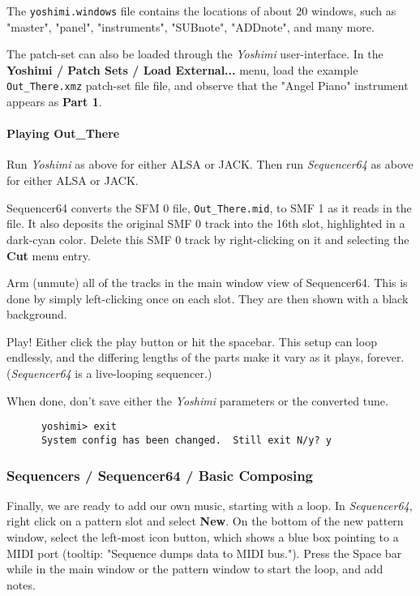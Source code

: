   The \texttt{yoshimi.windows} file contains the locations of about 20
   windows, such as "master", "panel", "instruments", "SUBnote", "ADDnote",
   and many more.

   The patch-set can also be loaded through the \textsl{Yoshimi}
   user-interface.
   In the \textbf{Yoshimi / Patch Sets / Load External...} menu, load the
   example \texttt{Out\_There.xmz} patch-set file file, and observe that
   the "Angel Piano" instrument appears as \textbf{Part 1}.

\paragraph{Playing Out\_There}
\label{paragraph:yoshimi_playing_out_there}

   Run \textsl{Yoshimi} as above for either ALSA or JACK.
   Then run \textsl{Sequencer64} as above for either ALSA or JACK.

   Sequencer64 converts the SFM 0 file, \texttt{Out\_There.mid},
   to SMF 1 as it reads in the file.
   It also deposits the original SMF 0 track into the 16th slot, highlighted in
   a dark-cyan color.
   Delete this SMF 0 track by right-clicking on it and selecting the
   \textbf{Cut} menu entry.

   Arm (unmute) all of the tracks in the main window view of Sequencer64.
   This is done by simply left-clicking once on each slot.
   They are then shown with a black background.

   Play!  Either click the play button or hit the spacebar.
   This setup can loop endlessly, and the differing lengths of the parts
   make it vary as it plays, forever.  (\textsl{Sequencer64} is a live-looping
   sequencer.)

   When done, don't save either the \textsl{Yoshimi} parameters or the
   converted tune.

   \begin{verbatim}
      yoshimi> exit
      System config has been changed.  Still exit N/y? y
   \end{verbatim}

\subsubsection{Sequencers / Sequencer64 / Basic Composing}
\label{subsubsec:sequencers_seq64_basic_composing}

   Finally, we are ready to add our own music, starting
   with a loop.  In \textsl{Sequencer64}, right click
   on a pattern slot and select \textbf{New}.  On the bottom of the new pattern
   window, select the left-most icon button, which shows a blue box pointing to
   a MIDI port (tooltip: "Sequence dumps data to MIDI bus.").
   Press the Space bar while in the main window or the pattern window
   to start the loop, and add notes.

